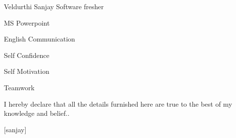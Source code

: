 \documentclass{article}
\begin{document}
\begin{cv}{Veldurthi Sanjay }{Software fresher}
\cvseparator
\begin{cvitem}
    MS Powerpoint
\end{cvitem}

\cvseparator
\begin{cvitem}
    English Communication
\end{cvitem}

\cvseparator
\begin{cvitem}
    Self Confidence
\end{cvitem}

\cvseparator
\begin{cvitem}
    Self Motivation
\end{cvitem}
\cvseparator
\begin{cvitem}
    Teamwork
\end{cvitem}




 \end{cv}
 

     I hereby declare that all the details furnished here are true to the best of my knowledge and belief..
                                                 
                                                 [sanjay]
\end{document}
